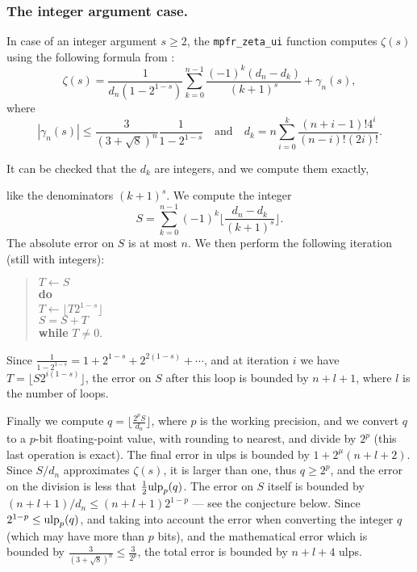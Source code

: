 \documentclass[12pt]{amsart}
\def\q{\hspace*{5mm}}
\def\ulp{{\rm ulp}}
\DeclareMathOperator{\error}{error}
\begin{document}
\subsubsection{The integer argument case.}
In case of an integer argument $s \geq 2$,
the \texttt{mpfr\_zeta\_ui} function computes
$\zeta(s)$ using the following formula from \cite{Borwein95}:
\[ \zeta(s) = \frac{1}{d_n (1-2^{1-s})} \sum_{k=0}^{n-1} \frac{(-1)^k
  (d_n - d_k)}{(k+1)^s} + \gamma_n(s), \]
where
\[ |\gamma_n(s)| \leq \frac{3}{(3+\sqrt{8})^n} \frac{1}{1-2^{1-s}}
\quad \mbox{and} \quad
   d_k = n \sum_{i=0}^k \frac{(n+i-1)! 4^i}{(n-i)! (2i)!}. \]

It can be checked that the $d_k$ are integers, and we compute them exactly,
\begin{comment}
d(n,k) =
{ n * sum(i=0,k,(n+i-1)!*4^i/(n-i)!/(2*i)!) }
a=log(2)/log(3+sqrt(8))
for (p=2,1000,n=ceil(a*p);if(d(n,n)<2^(p-1),\error(p)))
\end{comment}
like the denominators $(k+1)^s$.
We compute the integer
\[ S =
\sum_{k=0}^{n-1} (-1)^k \lfloor \frac{d_n - d_k}{(k+1)^s}
\rfloor. \]
The absolute error on $S$ is at most $n$. We then perform the following
iteration (still with integers):
\begin{quote}
$T \leftarrow S$ \\
\textbf{do} \\
\q $T \leftarrow \lfloor T 2^{1-s} \rfloor$ \\
\q $S = S + T$ \\
\textbf{while} $T \neq 0$.
\end{quote}
Since $\frac{1}{1-2^{1-s}} = 1 + 2^{1-s} + 2^{2(1-s)} + \cdots$, and
at iteration $i$ we have $T = \lfloor S 2^{i(1-s)} \rfloor$,
the error on $S$ after this loop is bounded by $n+l+1$,
where $l$ is the number of loops.

Finally we compute $q = \lfloor \frac{2^p S}{d_n} \rfloor$,
where $p$ is the working precision,
and we convert $q$ to a $p$-bit floating-point value,
with rounding to nearest, and divide by $2^p$ (this last operation is
exact).
The final error in ulps is bounded by $1 + 2^{\mu} (n+l+2)$.
Since $S/d_n$ approximates $\zeta(s)$, it is larger than one, thus
$q \geq 2^p$, and the error on the division is less that
$\frac{1}{2}\ulp_p(q)$. The error on $S$ itself is bounded by $(n+l+1)/d_n
\leq (n+l+1) 2^{1-p}$ --- see the conjecture below.
Since $2^{1-p} \leq \ulp_p(q)$, and taking into account the error when
converting the integer $q$ (which may have more than $p$ bits),
and the mathematical error which is bounded by $\frac{3}{(3+\sqrt{8})^n}
\leq \frac{3}{2^p}$, the total error is bounded by $n+l+4$ ulps.
\end{document}
